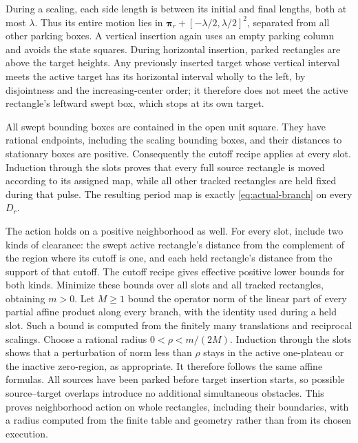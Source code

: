 \documentclass[11pt]{article}
\theoremstyle{remark}\newtheorem{remark}[theorem]{Remark}
\begin{document}
During a scaling, each side length is between its initial and final
lengths, both at most $\lambda$.  Thus its entire motion lies in
$\boldsymbol\pi_r+[-\lambda/2,\lambda/2]^2$, separated from all
other parking boxes.  A vertical insertion again uses an empty parking
column and avoids the state squares.  During horizontal insertion,
parked rectangles are above the target heights.  Any previously
inserted target whose vertical interval meets the active target has
its horizontal interval wholly to the left, by disjointness and the
increasing-center order; it therefore does not meet the active
rectangle's leftward swept box, which stops at its own target.

All swept bounding boxes are contained in the open unit square.
They have rational endpoints, including the scaling bounding boxes,
and their distances to stationary boxes are positive.  Consequently
the cutoff recipe applies at every slot.  Induction through the
slots proves that every full source rectangle is moved according to
its assigned map, while all other tracked rectangles are held fixed
during that pulse.  The resulting period map is exactly
\eqref{eq:actual-branch} on every $D_r$.

The action holds on a positive neighborhood as well. For every slot,
include two kinds of clearance: the swept active rectangle's distance
from the complement of the region where its cutoff is one, and each
held rectangle's distance from the support of that cutoff. The cutoff
recipe gives effective positive lower bounds for both kinds. Minimize
these bounds over all slots and all tracked rectangles, obtaining $m>0$.
Let $M\ge1$ bound the operator norm of the linear part of every partial
affine product along every
branch, with the identity used during a held slot. Such a bound is
computed from the finitely many translations and reciprocal scalings.
Choose a rational radius $0<\rho<m/(2M)$. Induction through the slots
shows that a perturbation of norm less than $\rho$ stays in the active
one-plateau or the inactive zero-region, as appropriate. It therefore
follows the same affine formulas. All sources have been parked before
target insertion starts, so possible source--target overlaps introduce
no additional simultaneous obstacles. This proves neighborhood action
on whole rectangles, including their boundaries, with a radius computed
from the finite table and geometry rather than from its chosen execution.
\end{document}
